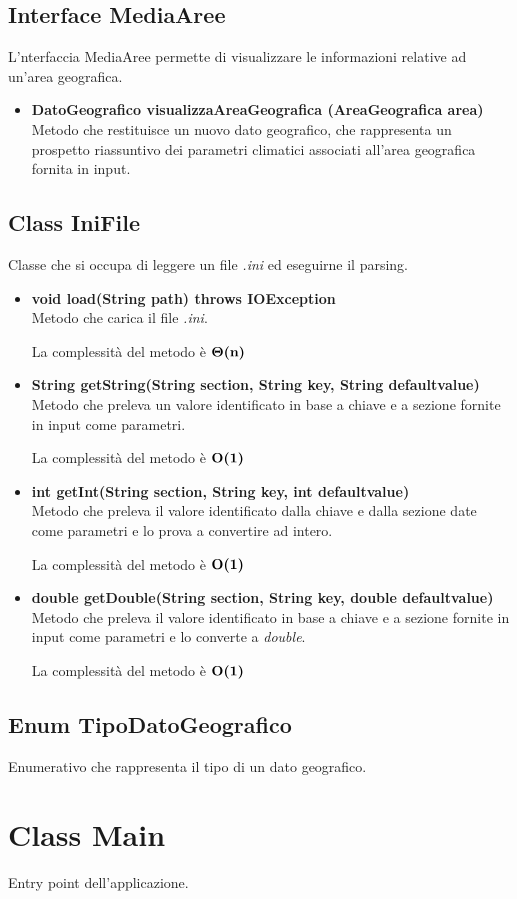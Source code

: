 \documentclass[a4paper, 12pt]{scrreprt}
\begin{document}
			\subsection{Interface MediaAree}
			L'nterfaccia MediaAree permette di visualizzare le informazioni relative ad un'area geografica.
			\begin{itemize}
				\item\textbf {DatoGeografico visualizzaAreaGeografica (AreaGeografica area)}
				\\Metodo che restituisce un nuovo dato geografico, che rappresenta un prospetto riassuntivo dei parametri climatici associati all'area geografica fornita in input.				
			\end{itemize}
			\pagebreak
			\subsection{Class IniFile}
			Classe che si occupa di leggere un file \textsl{.ini} ed eseguirne il parsing.
			\begin{itemize}
				\item \textbf{void load(String path) throws IOException}
				\\Metodo che carica il file \textsl{.ini}.
				
				La complessit\`a del metodo \`e $\mathbf{\Theta}\textbf{(n)}$
				
				\item \textbf{String getString(String section, String key, String defaultvalue)}
				\\Metodo che preleva un valore identificato in base a chiave e a sezione fornite in input come parametri.
				
				La complessit\`a del metodo \`e $\mathbf{O}\textbf{(1)}$
				
				\item \textbf{int getInt(String section, String key, int defaultvalue)}
				\\Metodo che preleva il valore identificato dalla chiave e dalla sezione date come parametri e lo prova a convertire ad intero.
				
				La complessit\`a del metodo \`e $\mathbf{O}\textbf{(1)}$
				
				\item \textbf{double getDouble(String section, String key, double defaultvalue)}
				\\Metodo che preleva il valore identificato in base a chiave e a sezione fornite in input come parametri e lo converte a \textsl{double}.
				
				La complessit\`a del metodo \`e $\mathbf{O}\textbf{(1)}$
				
				
			\end{itemize}
			\subsection{Enum TipoDatoGeografico}
			Enumerativo che rappresenta il tipo di un dato geografico.


		\section{Class Main}
		Entry point dell'applicazione.

	\nocite{IuriTex}
	
	
	\printindex
\end{document}

